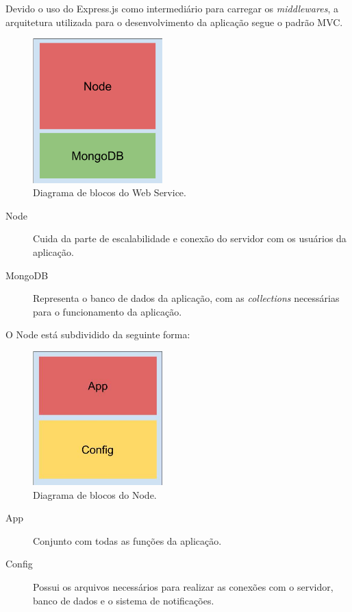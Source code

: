 \documentclass[
	12pt,				%
	oneside,			%
	a4paper,			%
	brazil				%
]{abntex2}
\begin{document}
Devido o uso do Express.js como intermediário para carregar os \textit{middlewares}, a arquitetura utilizada para o desenvolvimento da aplicação segue o padrão MVC.

\begin{figure}[h]
\centering
\includegraphics[width=5cm, center]{images/brick_diagram_framework_webservice}
\caption{Diagrama de blocos do Web Service.}
\label{Rotulo}
\end{figure}

\begin{description}
\item[Node] Cuida da parte de escalabilidade e conexão do servidor com os usuários da aplicação.
\item[MongoDB] Representa o banco de dados da aplicação, com as \textit{collections} necessárias para o funcionamento da aplicação.
\end{description}

O Node está subdividido da seguinte forma:

\begin{figure}[h]
\centering
\includegraphics[width=5cm, center]{images/brick_diagram_node}
\caption{Diagrama de blocos do Node.}
\label{Rotulo}
\end{figure}

\begin{description}
\item[App] Conjunto com todas as funções da aplicação.
\item[Config] Possui os arquivos necessários para realizar as conexões com o servidor, banco de dados e o sistema de notificações.
\end{description}
\end{document}
